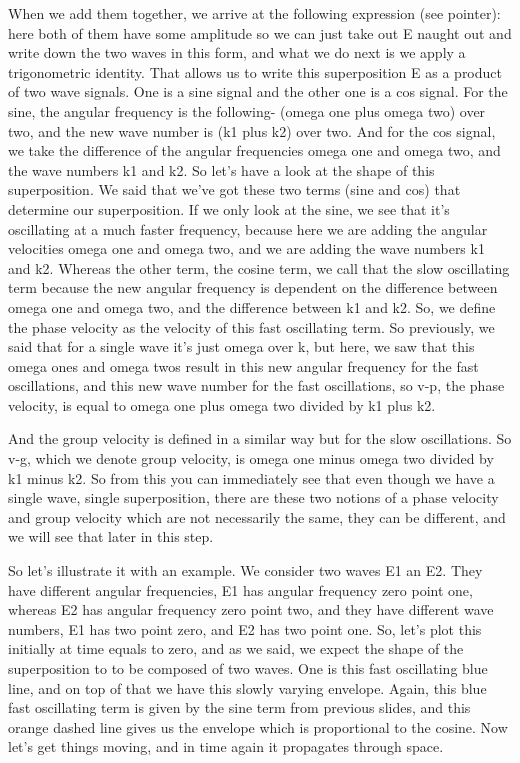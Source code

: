When we add them together, we arrive at the following expression (see pointer): here both of them have some amplitude so we can just take out E naught out and write down the two waves in this form, and what we do next is we apply a trigonometric identity. That allows us to write this superposition E as a product of two wave signals. One is a sine signal and the other one is a cos signal. For the sine, the angular frequency is the following- (omega one plus omega two) over two, and the new wave number is (k1 plus k2) over two. And for the cos signal, we take the difference of the angular frequencies omega one and omega two, and the wave numbers k1 and k2. So let's have a look at the shape of this superposition. We said that we've got these two terms (sine and cos) that determine our superposition. If we only look at the sine, we see that it's oscillating at a much faster frequency, because here we are adding the angular velocities omega one and omega two, and we are adding the wave numbers k1 and k2. Whereas the other term, the cosine term, we call that the slow oscillating term because the new angular frequency is dependent on the difference between omega one and omega two, and the difference between k1 and k2. So, we define the phase velocity as the velocity of this fast oscillating term. So previously, we said that for a single wave it's just omega over k, but here, we saw that this omega ones and omega twos result in this new angular frequency for the fast oscillations, and this new wave number for the fast oscillations, so v-p, the phase velocity, is equal to omega one plus omega two divided by k1 plus k2.

And the group velocity is defined in a similar way but for the slow oscillations. So v-g, which we denote group velocity, is omega one minus omega two divided by k1 minus k2. So from this you can immediately see that even though we have a single wave, single superposition, there are these two notions of a phase velocity and group velocity which are not necessarily the same, they can be different, and we will see that later in this step.

So let's illustrate it with an example. We consider two waves E1 an E2. They have different angular frequencies, E1 has angular frequency zero point one, whereas E2 has angular frequency zero point two, and they have different wave numbers, E1 has two point zero, and E2 has two point one. So, let's plot this initially at time equals to zero, and as we said, we expect the shape of the superposition to to be composed of two waves. One is this fast oscillating blue line, and on top of that we have this slowly varying envelope. Again, this blue fast oscillating term is given by the sine term from previous slides, and this orange dashed line gives us the envelope which is proportional to the cosine. Now let's get things moving, and in time again it propagates through space.

